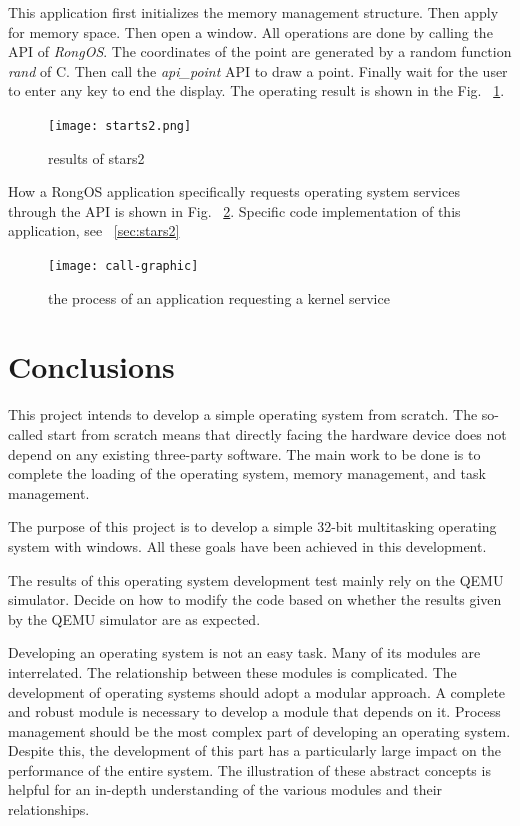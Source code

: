 \documentclass{swfcthesis}
\begin{document}
This application first initializes the memory management structure. Then apply for memory
space. Then open a window. All operations are done by calling the API of
\emph{RongOS}. The coordinates of the point are generated by a random function \emph{rand}
of C. Then call the \emph{api\_point} API to draw a point. Finally wait for the user to
enter any key to end the display. The operating result is shown in the
Fig. ~\ref{fig:result}.

\begin{figure}[!ht]
  \centering
  \texttt{[image: starts2.png]}
  \caption{results of stars2}
  \label{fig:result}
\end{figure}

How a RongOS application specifically requests operating system services through the API
is shown in Fig. ~\ref{fig:trap}. Specific code implementation of this application, see
~\ref{sec:stars2}

\begin{figure}[!ht]
  \centering
  \texttt{[image: call-graphic]}
  \caption{the process of an application requesting a kernel service}
  \label{fig:trap}
\end{figure}



\chapter{Conclusions}%
This project intends to develop a simple operating system from scratch. The so-called
start from scratch means that directly facing the hardware device does not depend on any
existing three-party software. The main work to be done is to complete the loading of the
operating system, memory management, and task management. 

The purpose of this project is to develop a simple 32-bit multitasking operating system
with windows. All these goals have been achieved in this development.

The results of this operating system development test mainly rely on the QEMU
simulator. Decide on how to modify the code based on whether the results given by the QEMU
simulator are as expected.

Developing an operating system is not an easy task. Many of its modules are
interrelated. The relationship between these modules is complicated. The development of
operating systems should adopt a modular approach. A complete and robust module is
necessary to develop a module that depends on it. Process management should be the most
complex part of developing an operating system. Despite this, the development of this part
has a particularly large impact on the performance of the entire system. The illustration
of these abstract concepts is helpful for an in-depth understanding of the various modules
and their relationships.
\end{document}
